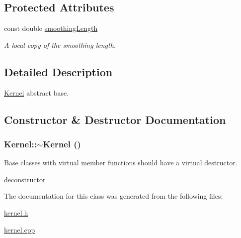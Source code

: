 \subsection*{Protected Attributes}
\begin{CompactItemize}
\item 
\hypertarget{classKernel_f088821dba4a00d1d320b27ebcb71258}{
const double \hyperlink{classKernel_f088821dba4a00d1d320b27ebcb71258}{smoothingLength}}
\label{classKernel_f088821dba4a00d1d320b27ebcb71258}

\begin{CompactList}\small\item\em A local copy of the smoothing length. \item\end{CompactList}\end{CompactItemize}


\subsection{Detailed Description}
\hyperlink{classKernel}{Kernel} abstract base. 

\subsection{Constructor \& Destructor Documentation}
\hypertarget{classKernel_9c7407e3a0b1cb9b2f96e9a030187064}{
\subsubsection[{$\sim$Kernel}]{\setlength{\rightskip}{0pt plus 5cm}Kernel::$\sim$Kernel ()}}
\label{classKernel_9c7407e3a0b1cb9b2f96e9a030187064}


Base classes with virtual member functions should have a virtual destructor. 

deconstructor 

The documentation for this class was generated from the following files:\begin{CompactItemize}
\item 
\hyperlink{kernel_8h}{kernel.h}\item 
\hyperlink{kernel_8cpp}{kernel.cpp}\end{CompactItemize}
